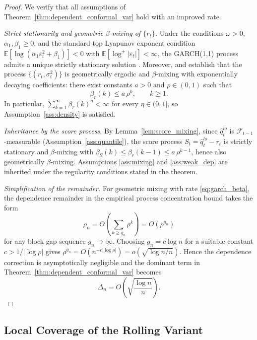 \documentclass[preprint,11pt,authoryear]{elsarticle}
\newcommand{\1}{\boldsymbol{1}}
\begin{document}
	\begin{proof}
		We verify that all assumptions of Theorem~\ref{thm:dependent_conformal_var} hold with an improved rate.
		
		\textit{Strict stationarity and geometric $\beta$-mixing of $\{r_t\}$.}\enspace
		Under the conditions $\omega>0$, $\alpha_1,\beta_1\ge 0$, and the standard top Lyapunov exponent condition $\mathbb E[\log(\alpha_1\varepsilon_t^2+\beta_1)]<0$ with $\mathbb E[\log^+|\varepsilon_t|]<\infty$, the GARCH(1,1) process admits a unique strictly stationary solution \citep[Theorem~2.10]{francq2019garch}. Moreover, \citet[Theorem~3.2]{francq2019garch} and \citet{lindner2009stationarity} establish that the process $\{(r_t,\sigma_t^2)\}$ is geometrically ergodic and $\beta$-mixing with exponentially decaying coefficients: there exist constants $a>0$ and $\rho\in(0,1)$ such that
		\begin{equation}\label{eq:garch_beta}
			\beta_r(k) \le a\,\rho^k, \qquad k\ge 1.
		\end{equation}
		In particular, $\sum_{k=1}^\infty \beta_r(k)^\eta < \infty$ for every $\eta\in(0,1]$, so Assumption~\ref{ass:density} is satisfied.
		
		\textit{Inheritance by the score process.}\enspace
		By Lemma~\ref{lem:score_mixing}, since $\hat q_t^{lo}$ is $\mathcal F_{t-1}$-measurable (Assumption~\ref{ass:quantile}), the score process $S_t = \hat q_t^{lo}-r_t$ is strictly stationary and $\beta$-mixing with $\beta_S(k) \le \beta_r(k-1)\le a\,\rho^{k-1}$, hence also geometrically $\beta$-mixing. Assumptions \ref{ass:mixing} and \ref{ass:weak_dep} are inherited under the regularity conditions stated in the theorem.
		
		\textit{Simplification of the remainder.}\enspace
		For geometric mixing with rate \eqref{eq:garch_beta}, the dependence remainder in the empirical process concentration bound takes the form
		\[
		\rho_n = O\!\left(\sum_{k\ge g_n}\rho^k\right) = O(\rho^{g_n})
		\]
		for any block gap sequence $g_n \to \infty$. Choosing $g_n = c\log n$ for a suitable constant $c > 1/|\log \rho|$ gives $\rho^{g_n} = O(n^{-c|\log\rho|}) = o(\sqrt{\log n / n})$. Hence the dependence correction is asymptotically negligible and the dominant term in Theorem~\ref{thm:dependent_conformal_var} becomes
		\[
		\Delta_n = O\!\left(\sqrt{\frac{\log n}{n}}\right).
		\]
	\end{proof}

	\subsection{Local Coverage of the Rolling Variant}
	\label{app:rolling_coverage}
\end{document}
